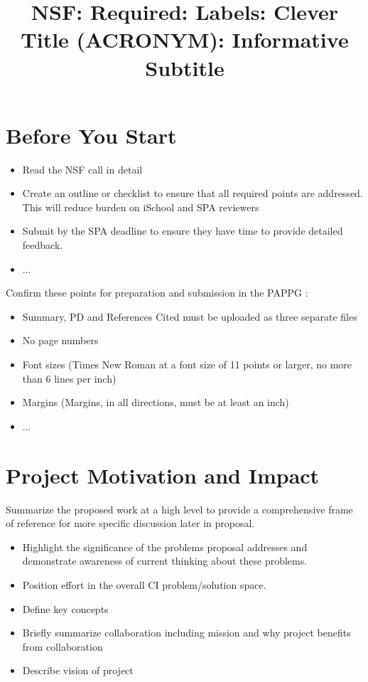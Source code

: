 
\title{\bf \Large NSF: Required: Labels: Clever Title (ACRONYM): Informative Subtitle 
 \vspace{-3em}}
\renewcommand{\title}
\author{}
\date{}
\author{}
\maketitle


\section{Before You Start}

\begin{itemize}
\item Read the NSF call in detail
\item Create an outline or checklist to ensure that all required points are addressed. This will reduce burden on iSchool and SPA reviewers
\item Submit by the SPA deadline to ensure they have time to provide detailed feedback. 
\item ...
\end{itemize}

Confirm these points for preparation and submission in the PAPPG \cite{nsf_ppag}:
\begin{itemize}
\item Summary, PD and References Cited must be uploaded as three separate files
\item No page numbers
\item Font sizes (Times New Roman at a font size of 11 points or larger, no more than 6 lines per inch)
\item Margins (Margins, in all directions, must be at least an inch) 
\item ...
\end{itemize}



\section{Project Motivation and Impact}

Summarize the proposed work at a high level to provide a comprehensive frame of reference for more specific discussion later in proposal.

\begin{itemize}
    \item Highlight the significance of the problems proposal addresses and demonstrate awareness of current thinking about these problems.
    \item Position effort in the overall CI problem/solution space.
    \item Define key concepts
    \item Briefly summarize collaboration including mission and why project benefits from collaboration
    \item Describe vision of project
\end{itemize}

